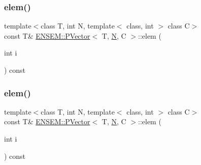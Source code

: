 \subsubsection{\texorpdfstring{elem()}{elem()}\hspace{0.1cm}{\footnotesize\ttfamily [5/6]}}
{\footnotesize\ttfamily template$<$class T, int N, template$<$ class, int $>$ class C$>$ \\
const T\& \mbox{\hyperlink{classENSEM_1_1PVector}{E\+N\+S\+E\+M\+::\+P\+Vector}}$<$ T, \mbox{\hyperlink{adat__devel_2lib_2hadron_2operator__name__util_8cc_a7722c8ecbb62d99aee7ce68b1752f337}{N}}, C $>$\+::elem (\begin{DoxyParamCaption}\item[{int}]{i }\end{DoxyParamCaption}) const\hspace{0.3cm}{\ttfamily [inline]}}

\mbox{\label{classENSEM_1_1PVector_a7c7ccc3b772ecddfeb58bb552ffcdbb9}} 
\subsubsection{\texorpdfstring{elem()}{elem()}\hspace{0.1cm}{\footnotesize\ttfamily [6/6]}}
{\footnotesize\ttfamily template$<$class T, int N, template$<$ class, int $>$ class C$>$ \\
const T\& \mbox{\hyperlink{classENSEM_1_1PVector}{E\+N\+S\+E\+M\+::\+P\+Vector}}$<$ T, \mbox{\hyperlink{adat__devel_2lib_2hadron_2operator__name__util_8cc_a7722c8ecbb62d99aee7ce68b1752f337}{N}}, C $>$\+::elem (\begin{DoxyParamCaption}\item[{int}]{i }\end{DoxyParamCaption}) const\hspace{0.3cm}{\ttfamily [inline]}}

\mbox{\label{classENSEM_1_1PVector_af17add91449d0507d1a0361ba1a3cc64}} 

